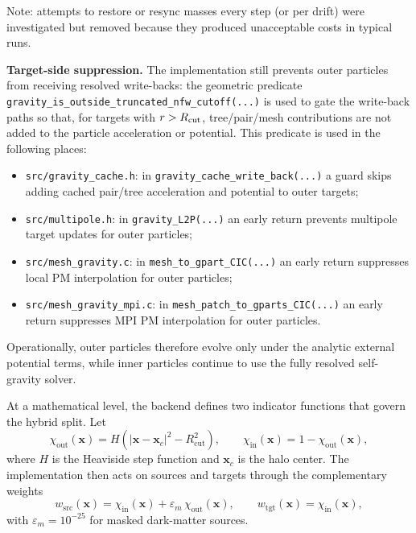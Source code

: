 Note: attempts to restore or resync masses every step (or per drift) were investigated but removed because they produced unacceptable costs in typical runs.

\textbf{Target-side suppression.} The implementation still prevents outer particles from receiving resolved write-backs: the geometric predicate \texttt{gravity\_is\_outside\_truncated\_nfw\_cutoff(...)} is used to gate the write-back paths so that, for targets with $r>R_{\rm cut}$, tree/pair/mesh contributions are not added to the particle acceleration or potential. This predicate is used in the following places:

\begin{itemize}
\item \texttt{src/gravity\_cache.h}: in \texttt{gravity\_cache\_write\_back(...)} a guard skips adding cached pair/tree acceleration and potential to outer targets;
\item \texttt{src/multipole.h}: in \texttt{gravity\_L2P(...)} an early return prevents multipole target updates for outer particles;
\item \texttt{src/mesh\_gravity.c}: in \texttt{mesh\_to\_gpart\_CIC(...)} an early return suppresses local PM interpolation for outer particles;
\item \texttt{src/mesh\_gravity\_mpi.c}: in \texttt{mesh\_patch\_to\_gparts\_CIC(...)} an early return suppresses MPI PM interpolation for outer particles.
\end{itemize}

Operationally, outer particles therefore evolve only under the analytic external potential terms, while inner particles continue to use the fully resolved self-gravity solver.

At a mathematical level, the backend defines two indicator functions that govern the hybrid split. Let
\begin{equation}
\chi_{\mathrm{out}}(\mathbf{x}) = H\!\left(|\mathbf{x}-\mathbf{x}_c|^2 - R_{\mathrm{cut}}^2\right),
\qquad
\chi_{\mathrm{in}}(\mathbf{x}) = 1-\chi_{\mathrm{out}}(\mathbf{x}),
\end{equation}
where $H$ is the Heaviside step function and $\mathbf{x}_c$ is the halo center. The implementation then acts on sources and targets through the complementary weights
\begin{equation}
w_{\mathrm{src}}(\mathbf{x}) = \chi_{\mathrm{in}}(\mathbf{x}) + \varepsilon_m\,\chi_{\mathrm{out}}(\mathbf{x}),
\qquad
w_{\mathrm{tgt}}(\mathbf{x}) = \chi_{\mathrm{in}}(\mathbf{x}),
\end{equation}
with $\varepsilon_m=10^{-25}$ for masked dark-matter sources.

